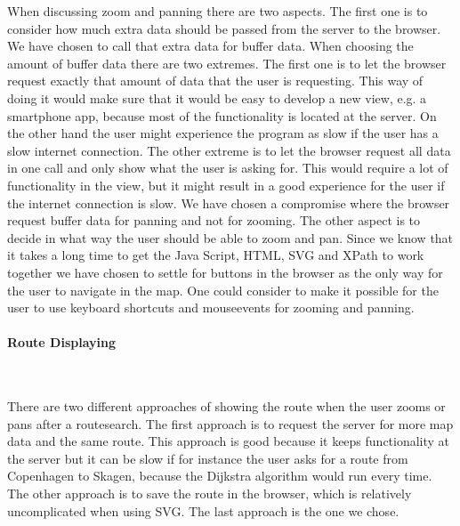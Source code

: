 \documentclass[a4paper,10pt,titlepage]{article}
\begin{document}
When discussing zoom and panning there are two aspects. The first one is to consider how much extra data should be passed from the server to the browser. We have chosen to call that extra data for buffer data. When choosing the amount of buffer data there are two extremes. The first one is to let the browser request exactly that amount of data that the user is requesting. This way of doing it would make sure that it would be easy to develop a new view, e.g. a smartphone app, because most of the functionality is located at the server. On the other hand the user might experience the program as slow if the user has a slow internet connection. The other extreme is to let the browser request all data in one call and only show what the user is asking for. This would require a lot of functionality in the view, but it might result in a good experience for the user if the internet connection is slow. We have chosen a compromise where the browser request buffer data for panning and not for zooming.
The other aspect is to decide in what way the user should be able to zoom and pan. Since we know that it takes a long time to get the Java Script, HTML, SVG and XPath to work together we have chosen to settle for buttons in the browser as the only way for the user to navigate in the map. One could consider to make it possible for the user to use keyboard shortcuts and mouseevents for zooming and panning. 

\paragraph{Route Displaying}\mbox{}\

There are two different approaches of showing the route when the user zooms or pans after a routesearch. The first approach is to request the server for more map data and the same route. This approach is good because it keeps functionality at the server but it can be slow if for instance the user asks for a route from Copenhagen to Skagen, because the Dijkstra algorithm would run every time. The other approach is to save the route in the browser, which is relatively uncomplicated when using SVG. The last approach is the one we chose.	
\end{document}
